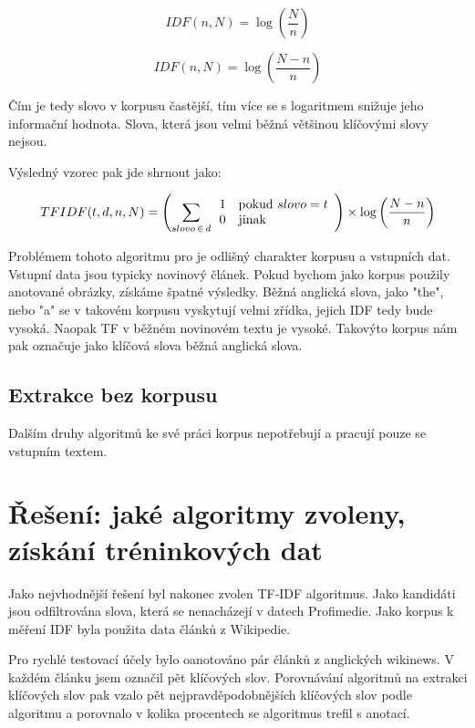 \begin{equation}
IDF(n,N) = \log \left(\frac{N}{n}\right)
\end{equation}

\begin{equation}
IDF(n,N) = \log \left(\frac{N - n}{n}\right)
\end{equation}

Čím je tedy slovo v korpusu častější, tím více se s logaritmem snižuje jeho informační hodnota. Slova, která jsou velmi běžná většinou klíčovými slovy nejsou.

Výsledný vzorec pak jde shrnout jako:

\begin{equation}
TFIDF(t,d,n,N)= \left(\sum_{slovo\,\in\,d} \begin{array}{l l} 1 & \mathrm{pokud}\ slovo = t \\
  0 & \mathrm{jinak} \end{array}\right)
  \times
  \log \left(\frac{N - n}{n}\right)
\end{equation}

Problémem tohoto algoritmu pro je odlišný charakter korpusu a vstupních dat. Vstupní data jsou typicky novinový článek. Pokud bychom jako korpus použily anotované obrázky, získáme špatné výsledky. Běžná anglická slova, jako "the", nebo "a" se v takovém korpusu vyskytují velmi zřídka, jejich IDF tedy bude vysoká. Naopak TF v běžném novinovém textu je vysoké. Takovýto korpus nám pak označuje jako klíčová slova běžná anglická slova.


\subsection{Extrakce bez korpusu}

Dalším druhy algoritmů ke své práci korpus nepotřebují a pracují pouze se vstupním textem.

\section{Řešení: jaké algoritmy zvoleny, získání tréninkových dat}

Jako nejvhodnější řešení byl nakonec zvolen TF-IDF algoritmus. Jako kandidáti jsou odfiltrována slova, která se nenacházejí v datech Profimedie. Jako korpus k měření IDF byla použita data článků z Wikipedie.

Pro rychlé testovací účely bylo oanotováno pár článků z anglických wikinews. V každém článku jsem označil pět klíčových slov. Porovnávání algoritmů na extrakci klíčových slov pak vzalo pět nejpravděpodobnějších klíčových slov podle algoritmu a porovnalo v kolika procentech se algoritmus trefil s anotací.



